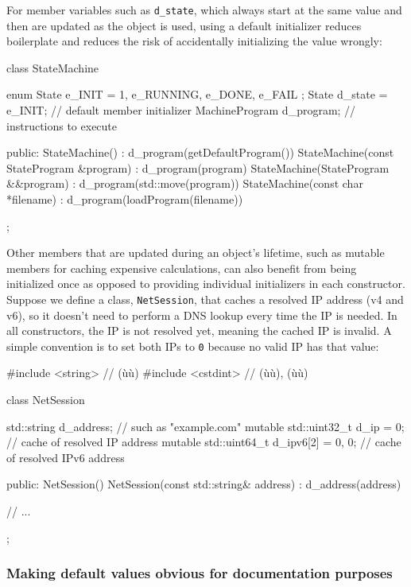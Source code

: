 For member variables such as \lstinline!d_state!, which always start at
the same value and then are updated as the object is used, using a
default initializer reduces boilerplate and reduces the risk of
accidentally initializing the value wrongly:

\begin{emcppslisting}
class StateMachine
{
    enum State { e_INIT = 1, e_RUNNING, e_DONE, e_FAIL };
    State          d_state = e_INIT;  // default member initializer
    MachineProgram d_program;         // instructions to execute

public:
    StateMachine() : d_program(getDefaultProgram()) { }
    StateMachine(const StateProgram &program) : d_program(program) { }
    StateMachine(StateProgram &&program) : d_program(std::move(program)) { }
    StateMachine(const char *filename) : d_program(loadProgram(filename)) { }
};
\end{emcppslisting}
    

Other members that are updated during an object's lifetime, such as
mutable members for caching expensive calculations, can also benefit
from being initialized once as opposed to providing individual
initializers in each constructor. Suppose we define a class,
\lstinline!NetSession!, that caches a resolved IP address (v4 and v6), so
it doesn't need to perform a DNS lookup every time the IP is needed. In
all constructors, the IP is not resolved yet, meaning the cached IP is
invalid. A simple convention is to set both IPs to \lstinline!0! because no
valid IP has that value:

\begin{emcppslisting}
#include <string>   // (ù{}ù)
#include <cstdint>  // (ù{}ù), (ù{}ù)

class NetSession
{
    std::string d_address;                     // such as "example.com"
    mutable std::uint32_t d_ip      = 0;       // cache of resolved IP address
    mutable std::uint64_t d_ipv6[2] = {0, 0};  // cache of resolved IPv6 address

public:
    NetSession() { }
    NetSession(const std::string& address) : d_address(address) { }

    // ...
};
\end{emcppslisting}
    

\subsubsection[Making default values obvious for documentation purposes]{Making default values obvious for documentation purposes}\label{making-default-values-obvious-for-documentation-purposes}

